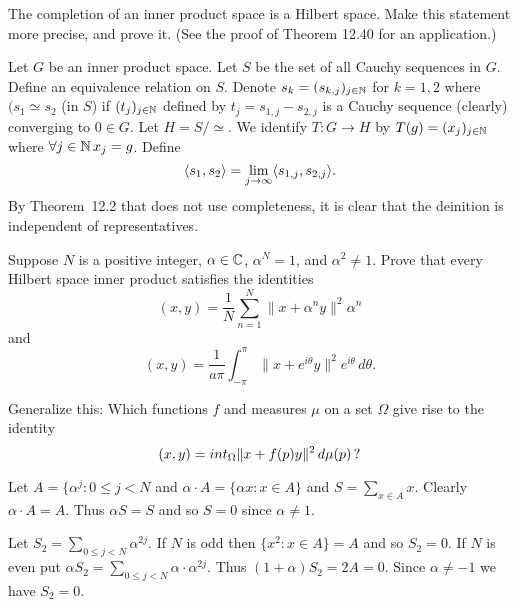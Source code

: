 \begin{enumerate}

\begin{excopy}
The completion of an inner product space is a Hilbert space.
Make this statement more precise, and prove it.
(See the proof of Theorem 12.40 for an application.)
\end{excopy}

Let $G$ be an inner product space.
Let $S$ be the set of all Cauchy sequences in $G$.
Define an equivalence relation on $S$.
Denote \(s_k = (s_{k,j})_{j\in\mathbb{N}}\) for \(k=1,2\)
where  \((s_1 \simeq s_2\) (in $S$)
if \((t_j)_{j\in\mathbb{N}}\) defined by \(t_j = s_{1,j}-s_{2,j}\)
is a Cauchy sequence (clearly) converging to \(0\in G\).
Let \(H = S/\simeq\). We identify \(T: G\to H\) by
\(T(g)=(x_j)_{j\in\mathbb{N}}\)  where \(\forall j\in\mathbb{N}\, x_j=g\).
Define 
\begin{equation*}
\langle s_1,s_2 \rangle = \lim_{j\to\infty} \langle s_{1,j},s_{2,j} \rangle.
\end{equation*}
By Theorem~12.2 that does not use completeness, it is clear
that the deinition is independent of representatives.

\begin{excopy}
Suppose $N$ is a positive integer,
\(\alpha \in \mathbb{C}\), \(\alpha^N = 1\), and \(\alpha^2 \neq 1\).
Prove that every
Hilbert space inner product satisfies the identities
\begin{equation*}
 (x, y) = \frac{1}{N}\sum_{n=1}^N \|x + \alpha^n y\|^2 \alpha^n
\end{equation*}
and
\begin{equation*}
 (x, y) = \frac{1}{a\pi}\int_{-\pi}^\pi \|x + e^{i\theta} y\|^2 e^{i\theta}\,d\theta.
\end{equation*}

Generalize this: Which functions $f$ and
measures \(\mu\) on a set \(\Omega\) give rise to the
identity
\begin{equation*}
 (x, y) = int_\Omega \|x + f(p)y\|^2 \,d\mu(p) \,\textnormal{?}
\end{equation*}

\end{excopy}

Let \(A = \{\alpha^j: 0\leq j < N\) and
\(\alpha\cdot A = \{\alpha x: x\in A\}\) and \(S=\sum_{x\in A} x\).
Clearly \(\alpha \cdot A = A\).
Thus \(\alpha S = S\) and so \(S=0\) since \(\alpha \neq 1\).

Let \(S_2 = \sum_{0\leq j<N} \alpha^{2j}\).
If $N$ is odd then \(\{x^2: x\in A\} = A\) and so \(S_2 = 0\).
If $N$ is even put \(\alpha S_2 = \sum_{0\leq j<N} \alpha\cdot\alpha^{2j}\).
Thus \((1+\alpha)S_2 = 2A = 0\). Since \(\alpha \neq -1\) we have \(S_2=0\).


\end{enumerate}
